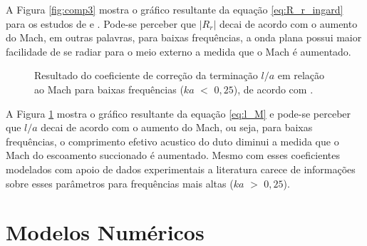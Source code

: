 A Figura \ref{fig:comp3} mostra o gráfico resultante da equação \ref{eq:R_r_ingard} para os estudos de  e  . Pode-se perceber que $|R_{r}|$ decai de acordo com o aumento do Mach, em outras palavras, para baixas frequências, a onda plana possui maior facilidade de se radiar para o meio externo a medida que o Mach é aumentado. 


\begin{figure}[h!]
\centering
  \caption[Coeficiente de correção da terminação $l/a$]{Resultado do coeficiente de correção da terminação $l/a$ em relação ao Mach para baixas frequências ($ka$ $<$ $0,25$), de acordo com .}
  \label{fig:comp4}
\end{figure}

 A Figura \ref{fig:comp4} mostra o gráfico resultante da equação \ref{eq:l_M} e pode-se perceber que $l/a$ decai de acordo com o aumento do Mach, ou seja, para baixas frequências, o comprimento efetivo acustico do duto diminui a medida que o Mach do escoamento succionado é aumentado. Mesmo com esses coeficientes modelados com apoio de dados experimentais a literatura carece de informações sobre esses parâmetros para frequências mais altas ($ka$ $>$ $0,25$).


\section{Modelos Numéricos}


